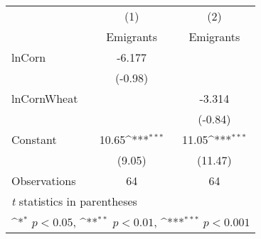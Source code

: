 {
\def\sym#1{\ifmmode^{#1}\else\(^{#1}\)\fi}
\begin{tabular}{l*{2}{c}}
\toprule
                    &\multicolumn{1}{c}{(1)}&\multicolumn{1}{c}{(2)}\\
                    &\multicolumn{1}{c}{Emigrants}&\multicolumn{1}{c}{Emigrants}\\
\midrule
lnCorn              &      -6.177         &                     \\
                    &     (-0.98)         &                     \\
\addlinespace
lnCornWheat         &                     &      -3.314         \\
                    &                     &     (-0.84)         \\
\addlinespace
Constant            &       10.65\sym{***}&       11.05\sym{***}\\
                    &      (9.05)         &     (11.47)         \\
\midrule
Observations        &          64         &          64         \\
\bottomrule
\multicolumn{3}{l}{\footnotesize \textit{t} statistics in parentheses}\\
\multicolumn{3}{l}{\footnotesize \sym{*} \(p<0.05\), \sym{**} \(p<0.01\), \sym{***} \(p<0.001\)}\\
\end{tabular}
}
